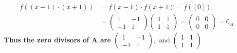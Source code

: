 \documentclass[12pt]{article}
\begin{document}
\begin{enumerate}[label = (\alph*)]
		\begin{align*}
			f((x-1) \cdot (x+1)) &= f(x-1) \cdot f(x+1) = f([0]) \\
			&=\begin{pmatrix}
				1 & -1 \\ -1 & 1
			\end{pmatrix}
			\begin{pmatrix}
				1 & 1 \\ 1 & 1
			\end{pmatrix}
			=\begin{pmatrix}
				0 & 0 \\ 0 & 0 
			\end{pmatrix} = 0_A
		\end{align*}
	\textbf{\boldmath Thus the zero divisors of A are 
	$\begin{pmatrix}
		1 & -1 \\ -1 & 1
	\end{pmatrix}, \text{ and }
	\begin{pmatrix}
		1 & 1 \\ 1 & 1
	\end{pmatrix}$ }
	
\end{enumerate}

\newpage
\end{document}
